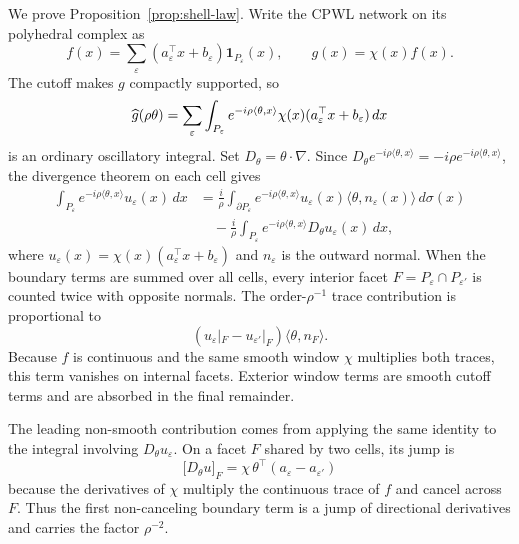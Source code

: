 We prove Proposition~\ref{prop:shell-law}. Write the CPWL network on its polyhedral complex as
\begin{equation}
f(x)=\sum_{\varepsilon}
(a_\varepsilon^\top x+b_\varepsilon)\mathbf 1_{P_\varepsilon}(x),
\qquad
g(x)=\chi(x)f(x).
\end{equation}
The cutoff makes $g$ compactly supported, so
\begin{equation}
\widehat g(\rho\theta)
=
\sum_\varepsilon
\int_{P_\varepsilon}
e^{-i\rho\langle \theta,x\rangle}
\chi(x)(a_\varepsilon^\top x+b_\varepsilon)\,dx
\end{equation}
is an ordinary oscillatory integral. Set $D_\theta=\theta\cdot\nabla$. Since
$D_\theta e^{-i\rho\langle\theta,x\rangle}=-i\rho e^{-i\rho\langle\theta,x\rangle}$,
the divergence theorem on each cell gives
\begin{align}
\int_{P_\varepsilon}e^{-i\rho\langle\theta,x\rangle}u_\varepsilon(x)\,dx
&=
\frac{i}{\rho}
\int_{\partial P_\varepsilon}
e^{-i\rho\langle\theta,x\rangle}
u_\varepsilon(x)\langle\theta,n_\varepsilon(x)\rangle\,d\sigma(x)
\nonumber\\
&\quad
-
\frac{i}{\rho}
\int_{P_\varepsilon}
e^{-i\rho\langle\theta,x\rangle}
D_\theta u_\varepsilon(x)\,dx,
\label{eq:first-ibp-cell-app}
\end{align}
where $u_\varepsilon(x)=\chi(x)(a_\varepsilon^\top x+b_\varepsilon)$ and $n_\varepsilon$ is the outward normal. When the boundary terms are summed over all cells, every interior facet $F=P_\varepsilon\cap P_{\varepsilon'}$ is counted twice with opposite normals. The order-$\rho^{-1}$ trace contribution is proportional to
\begin{equation}
\left(u_\varepsilon|_F-u_{\varepsilon'}|_F\right)
\langle \theta,n_F\rangle .
\end{equation}
Because $f$ is continuous and the same smooth window $\chi$ multiplies both traces, this term vanishes on internal facets. Exterior window terms are smooth cutoff terms and are absorbed in the final remainder.

The leading non-smooth contribution comes from applying the same identity to the integral involving $D_\theta u_\varepsilon$. On a facet $F$ shared by two cells, its jump is
\begin{equation}
\big[D_\theta u\big]_F
=
\chi\,\theta^\top(a_\varepsilon-a_{\varepsilon'})
\end{equation}
because the derivatives of $\chi$ multiply the continuous trace of $f$ and cancel across $F$. Thus the first non-canceling boundary term is a jump of directional derivatives and carries the factor $\rho^{-2}$.

